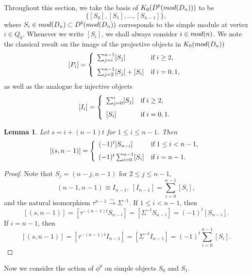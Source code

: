\documentclass[a4paper,reqno,11pt]{amsart}
\newtheorem{lemma}[theorem]{Lemma}
\theoremstyle{definition}
\def \text{\mbox}
\renewcommand{\mod}{\mathop{\rm mod}\nolimits}%
\begin{document}
Throughout this section, we take the basis of $K_0(D^b(\mod (D_n)))$ to be
$$\{[S_0], [S_1], \ldots, [S_{n-1}]\},$$ where $S_i \in \mod (D_n) \subset D^b(\mod (D_n))$ corresponds to the simple module at vertex $i \in Q_0$.
Whenever we write $[S_i]$, we shall always consider $i \in \mod (n)$.
We note the classical result on the image of the projective objects in $K_0(\mod (D_n))$
\[ [P_i]=\left\{
\begin{array}{ll}
\sum_{j=i}^{n-1} [S_j] & \text{if\;}  i \geq 2,\\[3mm]
		\sum_{j=2}^{n-1} [S_j]+[S_{i}]& \text{if\;} i=0,1,
\end{array}
\right.
\]	
as well as the analogue for injective objects
\[ [I_i]=\left\{
\begin{array}{ll}
\sum_{j=0}^{i} [S_j] & \text{if\;} i \geq 2,\\[3mm]
       {[S_i]} & \text{if\;} i=0,1.
\end{array}
\right.
\]
	
\begin{lemma}\label{simple}
	Let $s = i + (n-1)t$ for $1 \leq i \leq n-1$. Then
\[ [(s,n-1)]=\left\{
\begin{array}{ll}
(-1)^t [S_{n-i}] & \text{if\;} 1 \leq i < n-1,\\[2mm]
		(-1)^t \sum_{i=0}^{n-1} [S_i] & \text{if\;} i=n-1.
\end{array}
\right.
\]	

\end{lemma}

\begin{proof}
Note that $S_j=(n-j,n-1)$ for $2\leq j\leq n-1$,
$$(n-1,n-1) \cong I_{n-1},~[I_{n-1}]=\sum_{i=0}^{n-1} [S_i],$$
and the natural isomorphism $\tau^{n-1} \xrightarrow{\sim}  \Sigma^{-1}$. If $1 \leq i < n-1$, then
$$[(s,n-1)]=[\tau^{-(n-1)t}S_{n-i}]=[\Sigma^{-t}S_{n-i}]=(-1)^t [S_{n-i}].$$
If $i=n-1$, then
$$[(s,n-1)]=[\tau^{-(n-1)t}I_{n-1}]=[\Sigma^{-t}I_{n-1}]=(-1)^t \sum_{i=0}^{n-1} [S_i].$$
\end{proof}

Now we consider the action of $\phi^p$ on simple objects $S_0$ and $S_1$.
\end{document}
